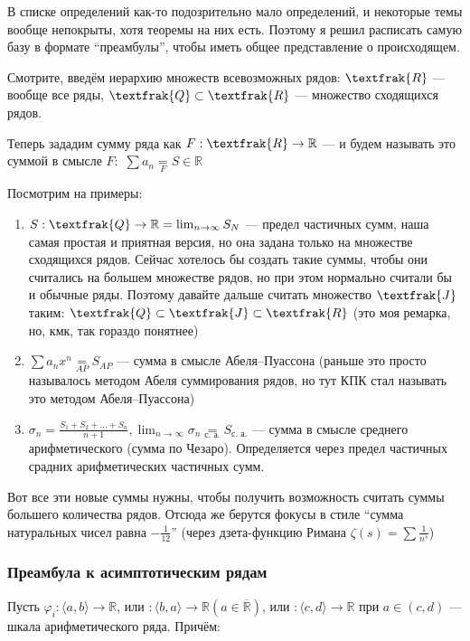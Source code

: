 \documentclass{article}
\def\dbl{\,\,}
\def\eqby#1{\underset{#1}{=}}
\begin{document}
В списке определений как-то подозрительно мало определений, и некоторые темы вообще непокрыты, хотя теоремы на них есть. Поэтому я решил расписать самую базу в формате ``преамбулы'', чтобы иметь общее представление о происходящем.

Смотрите, введём иерархию множеств всевозможных рядов: $\textfrak{R}$ --- вообще все ряды, $\textfrak{Q} \subset \textfrak{R}$ --- множество сходящихся рядов.

Теперь зададим сумму ряда как $F: \textfrak{R} \rightarrow \mathbb{R}$ --- и будем называть это суммой в смысле $F: \dbl \sum a_n \eqby{F} S \in \mathbb{R}$

Посмотрим на примеры: 

\begin{enumerate}
    \item $S: \textfrak{Q} \rightarrow \mathbb{R} = \lim_{n \rightarrow \infty} S_N$ --- предел частичных сумм, наша самая простая и приятная версия, но она задана только на множестве сходящихся рядов. Сейчас хотелось бы создать такие суммы, чтобы они считались на большем множестве рядов, но при этом нормально считали бы и обычные ряды. Поэтому давайте дальше считать множество $\textfrak{J}$ таким: $\textfrak{Q} \subset \textfrak{J} \subset \textfrak{R}$ (это моя ремарка, но, кмк, так гораздо понятнее)
    \item $\sum a_n x^n \eqby{AP} S_{AP}$ --- сумма в смысле Абеля--Пуассона (раньше это просто называлось методом Абеля суммирования рядов, но тут КПК стал называть это методом Абеля--Пуассона)
    \item $\sigma_n = \frac{S_1 + S_2 + \ldots + S_n}{n + 1}, \lim_{n \rightarrow \infty} \sigma_n \eqby{\text{с. а.}} S_{\text{с. а.}}$ --- сумма в смысле среднего арифметического (сумма по Чезаро). Определяется через предел частичных срадних арифметических частичных сумм.
\end{enumerate}

Вот все эти новые суммы нужны, чтобы получить возможность считать суммы большего количества рядов. Отсюда же берутся фокусы в стиле ``сумма натуральных чисел равна $-\frac{1}{12}$'' (через дзета-функцию Римана $\zeta(s) = \sum \frac{1}{n^s}$)

\subsubsection{Преамбула к асимптотическим рядам}

Пусть $\varphi_i: \langle a, b \rangle \rightarrow \mathbb{R}$, или $: \langle b, a \rangle \rightarrow \mathbb{R} (a \in \overline{\mathbb{R}})$, или $: \langle c, d \rangle \rightarrow \mathbb{R}$ при $a \in (c, d)$ --- шкала арифметического ряда. Причём: 
\end{document}
